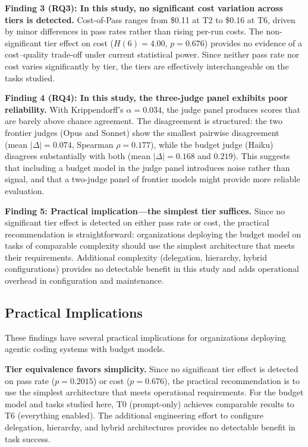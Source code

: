 \documentclass[11pt]{article}
\begin{document}
\textbf{Finding 3 (RQ3): In this study, no significant cost variation across tiers is detected.}
Cost-of-Pass ranges from \$0.11 at T2 to \$0.16 at T6, driven by minor
differences in pass rates rather than rising per-run costs. The non-significant
tier effect on cost ($H(6) = 4.00$, $p = 0.676$) provides no evidence of a
cost--quality trade-off under current statistical power. Since neither pass
rate nor cost varies significantly by tier, the tiers are effectively
interchangeable on the tasks studied.

\textbf{Finding 4 (RQ4): In this study, the three-judge panel exhibits poor
reliability.} With Krippendorff's $\alpha = 0.034$, the judge panel produces
scores that are barely above chance agreement. The disagreement
is structured: the two frontier judges (Opus and Sonnet) show the smallest
pairwise disagreement (mean $|\Delta| = 0.074$, Spearman $\rho = 0.177$),
while the budget judge (Haiku) disagrees substantially with both
(mean $|\Delta| = 0.168$ and $0.219$). This suggests that including a budget
model in the judge panel introduces noise rather than signal, and that a
two-judge panel of frontier models might provide more reliable evaluation.

\textbf{Finding 5: Practical implication---the simplest tier suffices.} Since
no significant tier effect is detected on either pass rate or cost, the
practical recommendation is straightforward: organizations deploying the budget
model on tasks of comparable complexity should use the simplest architecture
that meets their requirements. Additional complexity (delegation, hierarchy,
hybrid configurations) provides no detectable benefit in this study and adds
operational overhead in configuration and maintenance.

\subsection{Practical Implications}
\label{sec:practical_implications}

These findings have several practical implications for organizations deploying
agentic coding systems with budget models.

\textbf{Tier equivalence favors simplicity.} Since no significant tier effect
is detected on pass rate ($p=0.2015$) or cost ($p=0.676$), the practical
recommendation is to use the simplest architecture that meets operational
requirements. For the budget model and tasks studied here, T0 (prompt-only)
achieves comparable results to T6 (everything enabled). The additional
engineering effort to configure delegation, hierarchy, and hybrid
architectures provides no detectable benefit in task success.
\end{document}
